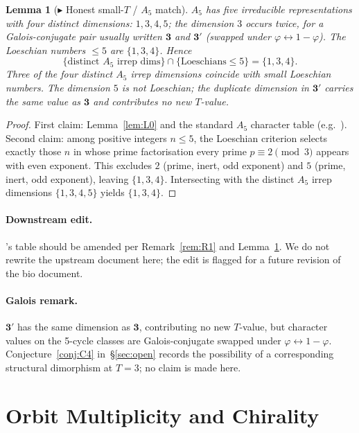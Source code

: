 \documentclass[12pt]{article}
\newtheorem{lemma}[theorem]{Lemma}
\begin{document}
\begin{lemma}[$\blacktriangleright$ Honest small-$T$ / $A_5$ match]\label{lem:L2}
$A_5$ has five irreducible representations with \emph{four} distinct
dimensions: $1, 3, 4, 5$; the dimension $3$ occurs twice, for a
Galois-conjugate pair usually written $\mathbf{3}$ and $\mathbf{3}'$
(swapped under $\varphi \leftrightarrow 1 - \varphi$). The Loeschian
numbers $\le 5$ are $\{1, 3, 4\}$. Hence
\[
\{\text{distinct } A_5 \text{ irrep dims}\} \cap \{\text{Loeschians} \le 5\} = \{1, 3, 4\}.
\]
Three of the four distinct $A_5$ irrep dimensions coincide with small
Loeschian numbers. The dimension $5$ is not Loeschian; the duplicate
dimension in $\mathbf{3}'$ carries the same value as $\mathbf{3}$ and
contributes no new $T$-value.
\end{lemma}

\begin{proof}
First claim: Lemma~\ref{lem:L0} and the standard $A_5$ character
table (e.g.~\cite{ATLAS}). Second claim: among positive integers
$n\le 5$, the Loeschian criterion selects exactly those $n$ in
whose prime factorisation every prime $p\equiv 2\pmod 3$ appears
with even exponent. This excludes $2$ (prime, inert, odd exponent)
and $5$ (prime, inert, odd exponent), leaving $\{1, 3, 4\}$.
Intersecting with the distinct $A_5$ irrep dimensions $\{1, 3, 4, 5\}$
yields $\{1, 3, 4\}$.
\end{proof}

\paragraph{Downstream edit.} \cite[\S B3.2]{CascadeBio}'s table should
be amended per Remark~\ref{rem:R1} and Lemma~\ref{lem:L2}. We do not
rewrite the upstream document here; the edit is flagged for a future
revision of the bio document.

\paragraph{Galois remark.} $\mathbf{3}'$ has the same dimension as
$\mathbf{3}$, contributing no new $T$-value, but character values on
the 5-cycle classes are Galois-conjugate swapped under
$\varphi \leftrightarrow 1 - \varphi$. Conjecture~\ref{conj:C4}
in~\S\ref{sec:open} records the possibility of a corresponding
structural dimorphism at $T = 3$; no claim is made here.

\section{Orbit Multiplicity and Chirality}\label{sec:mu}
\end{document}
